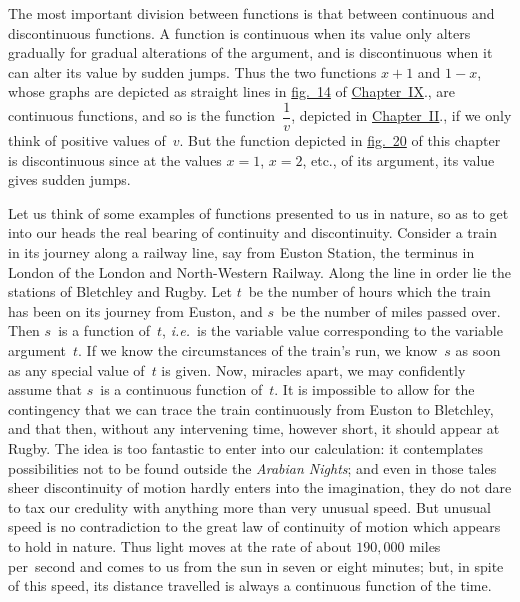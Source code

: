 \documentclass[12pt,leqno]{book}[2005/09/16]
\newcommand{\Chg}[2]{#2}
\newcommand{\Fig}[2][Fig.]{\hyperref[fig:#2]{#1~#2}}
\newcommand{\ChapRef}[2][Chapter]{\hyperref[chapter:#2]{\Chg{#1}{Chapter}~#2}}
\newcommand{\PageSep}[1]{\ignorespaces}
\newcommand{\ie}{\emph{i.e.}}
\newcommand{\Title}[1]{\textit{#1}}
\begin{document}
The most important division between functions
%
%
is that between continuous and discontinuous
functions. A function is continuous
when its value only alters gradually for
gradual alterations of the argument, and is
discontinuous when it can alter its value by
sudden jumps. Thus the two functions $x + 1$
and $1 - x$, whose graphs are depicted as
straight lines in \Fig[fig.]{14} of \ChapRef{IX}., are continuous
functions, and so is the function~$\dfrac{1}{v}$,
depicted in \ChapRef{II}., if we only think of
positive values of~$v$. But the function depicted
in \Fig[fig.]{20} of this chapter is discontinuous
since at the values $x = 1$, $x = 2$, etc., of its
argument, its value gives sudden jumps.

Let us think of some examples of functions
presented to us in nature, so as to get into
our heads the real bearing of continuity and
discontinuity. Consider a train in its journey
along a railway line, say from Euston Station,
the terminus in London of the London and
North-Western Railway. Along the line in
order lie the stations of Bletchley and Rugby.
Let $t$~be the number of hours which the train
has been on its journey from Euston, and $s$~be
the number of miles passed over. Then $s$~is
a function of~$t$, \ie~is the variable value
corresponding to the variable argument~$t$.
\PageSep{151}
If we know the circumstances of the train's
run, we know~$s$ as soon as any special value
of~$t$ is given. Now, miracles apart, we may
confidently assume that $s$~is a continuous
function of~$t$. It is impossible to allow for
the contingency that we can trace the train
continuously from Euston to Bletchley, and
that then, without any intervening time, however
short, it should appear at Rugby. The
idea is too fantastic to enter into our calculation:
it contemplates possibilities not to be
found outside the \Title{Arabian Nights}; and even
in those tales sheer discontinuity of motion
hardly enters into the imagination, they do
not dare to tax our credulity with anything
more than very unusual speed. But unusual
speed is no contradiction to the great law of
continuity of motion which appears to hold
in nature. Thus light moves at the rate of
about $190,000$ miles per~second and comes to
us from the sun in seven or eight minutes;
but, in spite of this speed, its distance travelled
is always a continuous function of the time.
\end{document}
